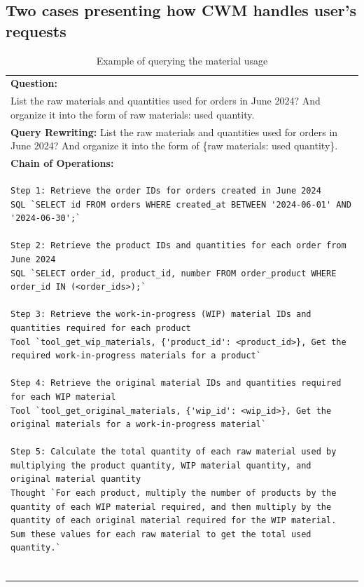 \documentclass[preprint,12pt]{elsarticle}
\begin{document}
\subsection{Two cases presenting how CWM handles user's requests}
\label{sec:exp_cases}
\begin{center}
\begin{longtable}{p{390pt}}
\caption{Example of querying the material usage}
    \label{tab:case_query_material}\\
    \toprule
      \textbf{Question:}     \\
       List the raw materials and quantities used for orders in June 2024? And organize it into the form of {raw materials: used quantity}.\\
          \hline
          \textbf{Query Rewriting: }
          List the raw materials and quantities used for orders in June 2024? And organize it into the form of \{raw materials: used quantity\}.\\
 \hline
\textbf{Chain of Operations:}\\

\begin{lstlisting}[style=my_operation, label={lst:chain_of_operation}]
Step 1: Retrieve the order IDs for orders created in June 2024
SQL `SELECT id FROM orders WHERE created_at BETWEEN '2024-06-01' AND '2024-06-30';`

Step 2: Retrieve the product IDs and quantities for each order from June 2024
SQL `SELECT order_id, product_id, number FROM order_product WHERE order_id IN (<order_ids>);`

Step 3: Retrieve the work-in-progress (WIP) material IDs and quantities required for each product
Tool `tool_get_wip_materials, {'product_id': <product_id>}, Get the required work-in-progress materials for a product`

Step 4: Retrieve the original material IDs and quantities required for each WIP material
Tool `tool_get_original_materials, {'wip_id': <wip_id>}, Get the original materials for a work-in-progress material`

Step 5: Calculate the total quantity of each raw material used by multiplying the product quantity, WIP material quantity, and original material quantity
Thought `For each product, multiply the number of products by the quantity of each WIP material required, and then multiply by the quantity of each original material required for the WIP material. Sum these values for each raw material to get the total used quantity.`


\end{lstlisting}
\end{longtable}
\end{center}
\end{document}
